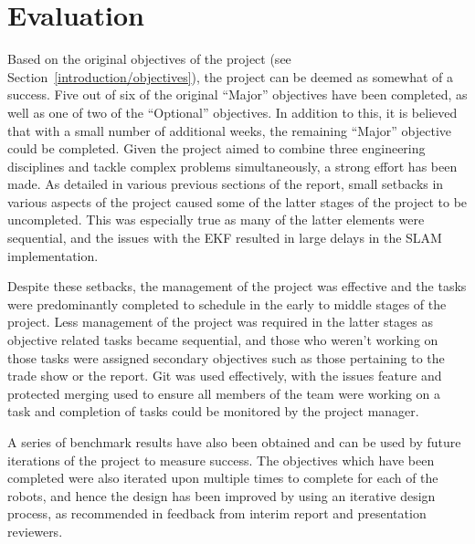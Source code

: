 
\chapter{Evaluation}\label{eval}
Based on the original objectives of the project (see Section~\ref{introduction/objectives}), the project can be deemed as somewhat of a success. Five out of six of
the original ``Major'' objectives have been completed, as well as one of two of
the ``Optional'' objectives. In addition to this, it is believed that with a
small number of additional weeks, the remaining ``Major'' objective could
be completed. Given the project aimed to combine three engineering
disciplines and tackle complex problems simultaneously, a strong
effort has been made.
As detailed in various previous sections of the report, small setbacks in
various aspects of the project caused some of the latter stages of the project to be
uncompleted. This was especially true as many of the latter elements were sequential,
and the issues with the EKF resulted in large delays in the SLAM implementation.

Despite these setbacks, the management of the project was effective and the tasks were predominantly completed to schedule in the early to middle
stages of the project. Less management of the project was required in the latter
stages as objective related tasks became sequential, and those who weren't
working on those tasks were assigned secondary objectives such as those
pertaining to the trade show or the report. Git was used effectively, with the
issues feature and protected merging used to ensure all members of the team were
working on a task and completion of tasks could be monitored by the project
manager.

A series of benchmark results have also been obtained and can be used by future
iterations of the project to measure success. The
objectives which have been completed were also iterated upon multiple times to
complete for each of the robots, and hence the design has
been improved by using an iterative design process, as recommended in feedback from interim report and presentation reviewers.

